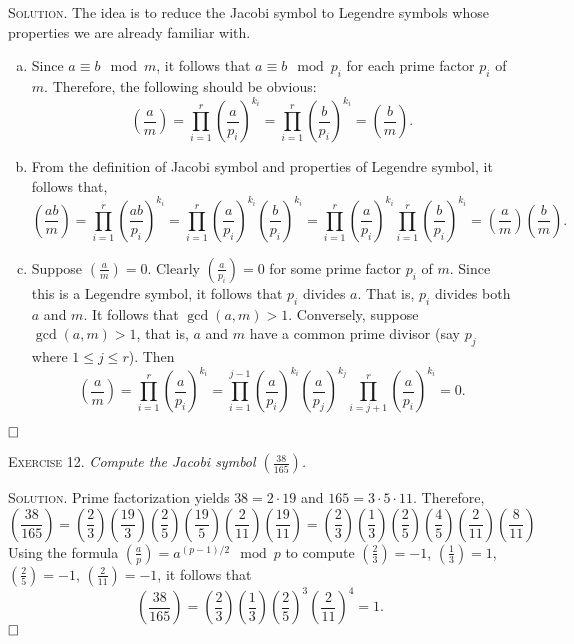 \documentclass[11pt, leqno]{article}
\newcommand{\done}{\ensuremath{\hfill\square}}
\begin{document}
\textsc{Solution}. The idea is to reduce the Jacobi symbol to Legendre symbols whose properties we are already familiar with.
\begin{enumerate}[(a)]
\item Since $a\equiv b \mod m$, it follows that $a \equiv b \mod p_i$ for each prime factor $p_i$ of $m$. Therefore, the following should be obvious: 
\begin{displaymath}
\left( \frac{a}{m} \right) = \prod_{i=1}^r \left( \frac{a}{p_i} \right)^{k_i} = \prod_{i=1}^r \left( \frac{b}{p_i} \right)^{k_i} = \left( \frac{b}{m} \right).
\end{displaymath} 
\item From the definition of Jacobi symbol and properties of Legendre symbol, it follows that, 
\begin{displaymath}
\left( \frac{ab}{m} \right) = \prod_{i=1}^r \left( \frac{ab}{p_i} \right)^{k_i} = \prod_{i=1}^r \left( \frac{a}{p_i} \right)^{k_i} \left( \frac{b}{p_i} \right)^{k_i} = \prod_{i=1}^r \left( \frac{a}{p_i} \right)^{k_i} \prod_{i=1}^r \left( \frac{b}{p_i} \right)^{k_i} = \left( \frac{a}{m} \right) \left( \frac{b}{m} \right).
\end{displaymath} 
\item Suppose $\left( \frac{a}{m} \right) = 0$. Clearly $\left( \frac{a}{p_i} \right) = 0$ for some prime factor $p_i$ of $m$. Since this is a Legendre symbol, it follows that $p_i$ divides $a$. That is, $p_i$ divides both $a$ and $m$. It follows that $\gcd(a,m)>1$. Conversely, suppose $\gcd(a,m)>1$, that is, $a$ and $m$ have a common prime divisor (say $p_j$ where $1\leq j \leq r$). Then 
\begin{displaymath}
\left( \frac{a}{m} \right) = \prod_{i=1}^r \left( \frac{a}{p_i} \right)^{k_i} = \prod_{i=1}^{j-1} \left( \frac{a}{p_i} \right)^{k_i} \left( \frac{a}{p_j} \right)^{k_j} \prod_{i=j+1}^r \left( \frac{a}{p_i} \right)^{k_i} = 0.
\end{displaymath}
\end{enumerate}\done

\textsc{Exercise 12}. \emph{Compute the Jacobi symbol $\left( \frac{38}{165} \right)$.}

\textsc{Solution}. Prime factorization yields $38 = 2 \cdot 19$ and $165 = 3 \cdot 5 \cdot 11$. Therefore, 
\begin{displaymath}
\left( \frac{38}{165} \right) = \left( \frac{2}{3} \right) \left( \frac{19}{3} \right) \left( \frac{2}{5} \right) \left( \frac{19}{5} \right) \left( \frac{2}{11} \right) \left( \frac{19}{11} \right) = \left( \frac{2}{3} \right) \left( \frac{1}{3} \right) \left( \frac{2}{5} \right) \left( \frac{4}{5} \right) \left( \frac{2}{11} \right) \left( \frac{8}{11} \right)
\end{displaymath}
Using the formula $\left( \frac{a}{p} \right) = a^{(p-1)/2} \mod p$ to compute $\left( \frac{2}{3} \right) = -1$, $\left( \frac{1}{3} \right) = 1$, $\left( \frac{2}{5} \right) = -1$, $\left( \frac{2}{11} \right) = -1$, it follows that 
\begin{displaymath}
\left( \frac{38}{165} \right) = \left( \frac{2}{3} \right) \left( \frac{1}{3} \right) \left( \frac{2}{5} \right)^3 \left( \frac{2}{11} \right)^4 = 1.
\end{displaymath}
\done
\end{document}

